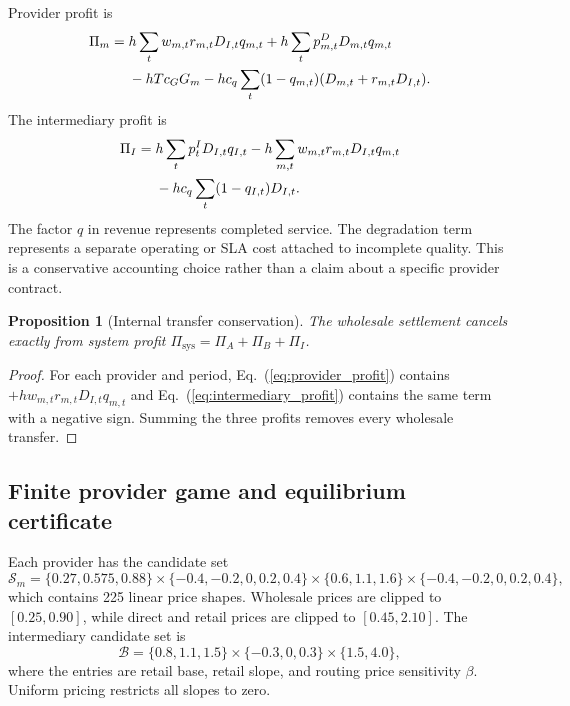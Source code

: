 \documentclass[11pt,a4paper]{article}
\newtheorem{proposition}{Proposition}
\newcommand{\Sset}{\mathcal{S}}
\begin{document}
Provider profit is
\begin{align}
\Pi_m={}&h\sum_t w_{m,t}r_{m,t}D_{I,t}q_{m,t}
+h\sum_t p^D_{m,t}D_{m,t}q_{m,t} \notag\\
&-hTc_GG_m
-hc_q\sum_t(1-q_{m,t})(D_{m,t}+r_{m,t}D_{I,t}).
\label{eq:provider_profit}
\end{align}
The intermediary profit is
\begin{align}
\Pi_I={}&h\sum_t p^I_tD_{I,t}q_{I,t}
-h\sum_{m,t}w_{m,t}r_{m,t}D_{I,t}q_{m,t} \notag\\
&-hc_q\sum_t(1-q_{I,t})D_{I,t}.
\label{eq:intermediary_profit}
\end{align}
The factor $q$ in revenue represents completed service. The degradation term represents a separate operating or SLA cost attached to incomplete quality. This is a conservative accounting choice rather than a claim about a specific provider contract.

\begin{proposition}[Internal transfer conservation]
The wholesale settlement cancels exactly from system profit $\Pi_{\mathrm{sys}}=\Pi_A+\Pi_B+\Pi_I$.
\end{proposition}
\begin{proof}
For each provider and period, Eq.~(\ref{eq:provider_profit}) contains $+hw_{m,t}r_{m,t}D_{I,t}q_{m,t}$ and Eq.~(\ref{eq:intermediary_profit}) contains the same term with a negative sign. Summing the three profits removes every wholesale transfer.
\end{proof}

\subsection{Finite provider game and equilibrium certificate}

Each provider has the candidate set
\begin{equation}
\Sset_m=\{0.27,0.575,0.88\}
\times\{-0.4,-0.2,0,0.2,0.4\}
\times\{0.6,1.1,1.6\}
\times\{-0.4,-0.2,0,0.2,0.4\},
\label{eq:provider_grid}
\end{equation}
which contains 225 linear price shapes. Wholesale prices are clipped to $[0.25,0.90]$, while direct and retail prices are clipped to $[0.45,2.10]$. The intermediary candidate set is
\begin{equation}
\mathcal B=\{0.8,1.1,1.5\}\times\{-0.3,0,0.3\}\times\{1.5,4.0\},
\label{eq:intermediary_grid}
\end{equation}
where the entries are retail base, retail slope, and routing price sensitivity $\beta$. Uniform pricing restricts all slopes to zero.
\end{document}
